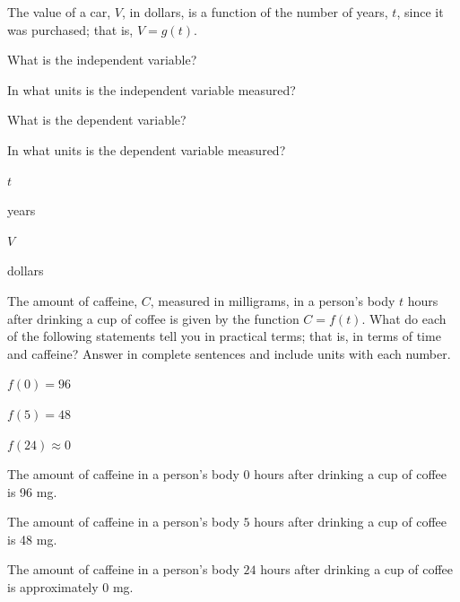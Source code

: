 
\begin{exercise}
The value of a car, $V$, in dollars, is a function of the number of years, $t$, since it was purchased; that is, $V=g(t)$.
\begin{parts}
\item What is the independent variable?

\item In what units is the independent variable measured?

\item What is the dependent variable?

\item In what units is the dependent variable measured?
\end{parts}
\end{exercise}


\begin{solution}

\begin{parts}
\item $t$
\item years
\item $V$
\item dollars
\end{parts}
\end{solution}





\begin{exercise}
The amount of caffeine, $C$, measured in milligrams, in a person's body $t$ hours after drinking a cup of coffee is given by the function $C=f(t)$. What do each of the following statements tell you in practical terms; that is, in terms of time and caffeine? Answer in complete sentences and include units with each number.


\begin{parts}
\item $f(0)=96$
\item $f(5)=48$
\item $f(24)\approx 0$ 
\end{parts}
\end{exercise}

\begin{solution}

\begin{parts}
\item The amount of caffeine in a person's body $0$ hours after drinking a cup of coffee is 96 mg.
\item The amount of caffeine in a person's body $5$ hours after drinking a cup of coffee is 48 mg.
\item The amount of caffeine in a person's body $24$ hours after drinking a cup of coffee is approximately 0 mg.
\end{parts}
\end{solution}












